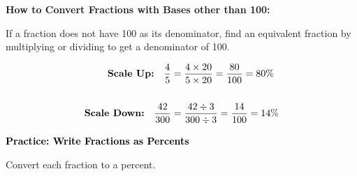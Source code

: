 \documentclass[12pt, letterpaper, fleqn]{article}
\begin{document}
\vspace{4mm}

\newpage


\begin{tcolorbox}[colback=white, colframe=black!25, boxrule=0.6pt, arc=4mm, left=6mm, right=6mm, top=5mm, bottom=5mm]

\textbf{How to Convert Fractions with Bases other than 100:}

\noindent
If a fraction does not have 100 as its denominator, find an equivalent fraction by multiplying or dividing to get a denominator of 100.

\vspace{0.3cm}

\begin{align*}
\text{\textbf{Scale Up:}} \quad \dfrac{4}{5} &= \dfrac{4 \times 20}{5 \times 20} = \dfrac{80}{100} = 80\% \\ \\
\text{\textbf{Scale Down:}} \quad \dfrac{42}{300} &= \dfrac{42 \div 3}{300 \div 3} = \dfrac{14}{100} = 14\%
\end{align*}

\end{tcolorbox}

\vspace{4mm}


\begin{tcolorbox}[colback=customteal!20]
\large\textcolor{black}{\textbf{Practice: Write Fractions as Percents}}
\end{tcolorbox}

\noindent
Convert each fraction to a percent.

\vspace{1.5cm}
\end{document}
